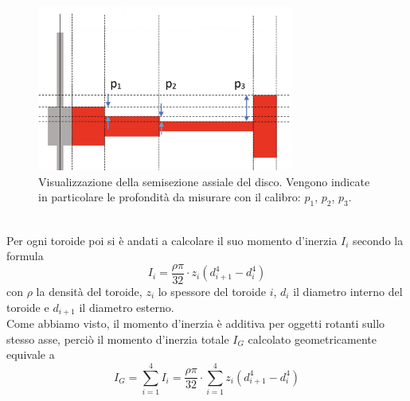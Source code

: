     \begin{figure}[htbp]
        \centering
        \includegraphics[width=0.75\textwidth]{image/Profondità.jpeg}
        \caption[\small Visualizzazione della semisezione assiale del disco - profondità]{\small Visualizzazione della semisezione assiale del disco. Vengono indicate in particolare le profondità da misurare con il calibro: $p_1$, $p_2$, $p_3$.}
        \label{profondità}
    \end{figure}\\
Per ogni toroide poi si è andati a calcolare il suo momento d'inerzia $I_i$ secondo la formula
$$\displaystyle I_i = \frac{\rho \pi}{32} \cdot z_i (d_{i+1}^4 - d_i^4) $$
con $\rho$ la densità del toroide, $z_i$ lo spessore del toroide $i$, $d_i$ il diametro interno del toroide e $d_{i+1}$ il diametro esterno.\\
Come abbiamo visto, il momento d'inerzia è additiva per oggetti rotanti sullo stesso asse, perciò il momento d'inerzia totale $I_G$ calcolato geometricamente equivale a
\begin{equation} \label{I_G}
    \displaystyle I_G = \sum_{i=1}^4  I_i = \frac{\rho \pi}{32} \cdot \sum_{i=1}^4 z_i (d_{i+1}^4 - d_i^4)
\end{equation}

